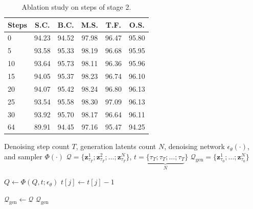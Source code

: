 \documentclass{article}
\theoremstyle{plain}
\theoremstyle{definition}
\theoremstyle{remark}
\begin{document}
\label{app:more_exp}
\begin{table}[htbp]
    \centering
    \small
    \caption{Ablation study on steps of stage 2.}
    \label{app:tab_1}
    \begin{tabular}{lccccc} 
        \toprule
        \textbf{Steps} & \textbf{S.C.} & \textbf{B.C.} & \textbf{M.S.} & \textbf{T.F.} & \textbf{O.S.} \\
        \midrule
         0   & 94.23 & 94.52 & 97.98 & 96.47 & 95.80 \\
         5   & 93.58 & 95.33 & 98.19 & 96.68 & 95.95 \\
        10   & 93.64 & 95.73 & 98.11 & 96.36 & 95.96 \\
        15   & 94.05 & 95.37 & 98.23 & 96.74 & 96.10 \\
        20   & 94.07 & 95.42 & 98.24 & 96.80 & 96.13 \\
        25   & 93.54 & 95.58 & 98.30 & 97.09 & 96.13 \\
        30   & 93.92 & 95.70 & 98.17 & 96.64 & 96.11 \\
        64   & 89.91 & 94.45 & 97.16 & 95.47 & 94.25 \\
        \bottomrule
    \end{tabular}
\end{table}


\begin{algorithm}[htbp]
\caption{Inference procedure with stage 2 only}
\label{alg:only_stage_2}
\begin{algorithmic}[1]

 Denoising step count $T$, generation latents count $N$, denoising network $\epsilon_{\theta}(\cdot)$, and sampler $\Phi(\cdot)$
 $\mathcal{Q} = \{\mathbf{z}_{\tau_T}^1; \mathbf{z}_{\tau_T}^2; \dots; \mathbf{z}_{\tau_T}^N\}$, $t = \underbrace{\{\tau_T; \tau_T; \dots; \tau_T}_{N}\}$
 $\mathcal{Q}_\mathrm{gen} = \{\mathbf{z}_{\tau_0}^1; \dots; \mathbf{z}_{\tau_0}^N\}$

    \STATE $Q \gets \Phi(Q, t; \epsilon_\theta)$
        \STATE $t[j] \gets t[j] - 1$
    \ENDFOR
\ENDFOR

\STATE $\mathcal{Q}_\mathrm{gen} \gets \mathcal{Q}$
 $\mathcal{Q}_\mathrm{gen}$

\end{algorithmic}
\end{algorithm}
\end{document}
